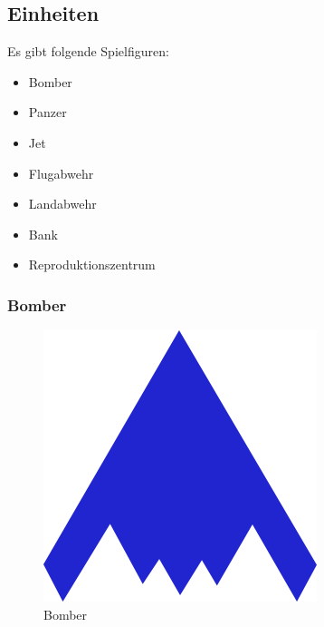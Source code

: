 \documentclass[ngerman, 12pt, pdftex]{scrartcl}[2006/07/30]
\begin{document}
%

\newpage

\subsection{Einheiten} \label{subsec:Einheit}

Es gibt folgende Spielfiguren: 
\begin{itemize}
\item Bomber
\item Panzer
\item Jet
\item Flugabwehr
\item Landabwehr
\item Bank
\item  Reproduktionszentrum
\end{itemize}

\subsubsection{Bomber}

\begin{figure}[h]
\centering
\includegraphics[scale=1.8]{einheiten/Bomber.png}
\caption{Bomber}
\end{figure}
\end{document}
